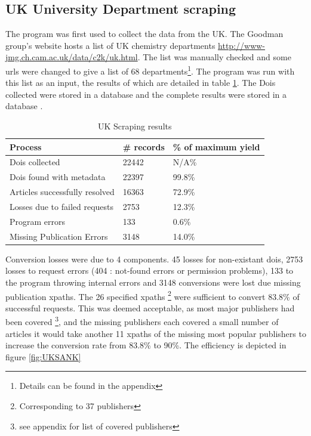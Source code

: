 \subsection{UK University Department scraping}
\label{sec:UKSCRAPE}
The program was first used to collect the data from the UK. The Goodman group's website hosts a list of UK chemistry departments \url{http://www-jmg.ch.cam.ac.uk/data/c2k/uk.html}. The list was manually checked and some urls were changed to give a list of 68 departments\footnote{Details can be found in the appendix}. The program was run with this list as an input, the results of which are detailed in table \ref{tab:UKSCRAPERES}. The Dois collected were stored in a database  and the complete results were stored in a database .
\begin{table}[h!]
\caption{UK Scraping results}
\label{tab:UKSCRAPERES}

\begin{center}
\begin{tabular}{||l|l|l||}
\hline
Process & \# records & \% of maximum yield\\
\hline
Dois collected & 22442 & N/A\%\\
Dois found with metadata & 22397 & 99.8\%\\
Articles successfully resolved & 16363 & 72.9\%\\
Losses due to failed requests & 2753 & 12.3\%\\
Program errors & 133 & 0.6\%\\
Missing Publication Errors & 3148 & 14.0\% \\
\hline
\end{tabular}
\end{center}
\end{table}
Conversion losses were due to 4 components. 45 losses for non-existant dois, 2753 losses to request errors (404 : not-found errors or permission problems), 133 to the program throwing internal errors and 3148 conversions were lost due missing publication xpaths. The 26 specified xpaths \footnote{Corresponding to 37 publishers} were sufficient to convert 83.8\% of successful requests. This was deemed acceptable, as most major publishers had been covered \footnote{see appendix for list of covered publishers}, and the missing publishers each covered a small number of articles it would take another 11 xpaths of the missing most popular publishers to increase the conversion rate from 83.8\% to 90\%.
The efficiency is depicted in figure \ref{fig:UKSANK}

